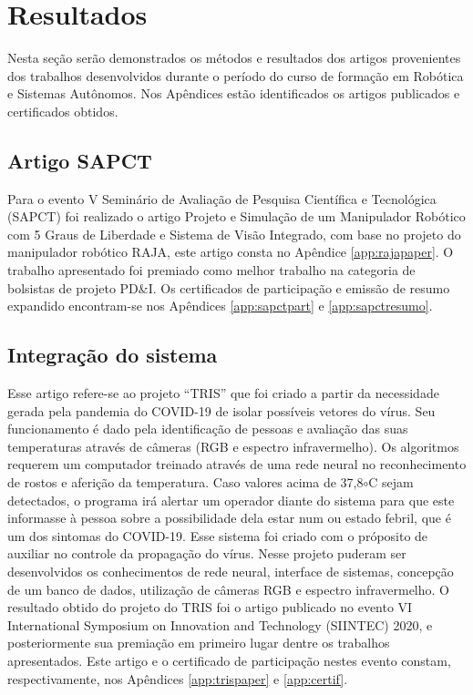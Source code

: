 \chapter{Resultados}
\label{chap:result}

Nesta seção serão demonstrados os métodos e resultados dos artigos provenientes dos
trabalhos desenvolvidos durante o período do curso de formação em Robótica e Sistemas Autônomos. Nos Apêndices estão identificados os artigos publicados e certificados obtidos.

\section{Artigo SAPCT}
\label{sec:artigoRAJA}

Para o evento V Seminário de Avaliação de Pesquisa Científica e Tecnológica (SAPCT)
foi realizado o artigo Projeto e Simulação de um Manipulador Robótico com 5 Graus de
Liberdade e Sistema de Visão Integrado, com base no projeto do manipulador robótico
RAJA, este artigo consta no Apêndice \ref{app:rajapaper}. O trabalho apresentado foi premiado como melhor trabalho na categoria de bolsistas de projeto PD\&I. Os certificados de participação e emissão de resumo expandido encontram-se nos Apêndices \ref{app:sapctpart} e \ref{app:sapctresumo}.


\section{Integração do sistema}
\label{sec:artigoTRIS}

Esse artigo refere-se ao projeto ``TRIS'' que foi criado a partir da necessidade gerada pela pandemia do COVID-19 de isolar possíveis vetores do vírus. Seu funcionamento é dado pela identificação de pessoas e avaliação das suas temperaturas através de câmeras (RGB e espectro infravermelho). Os algoritmos requerem um computador treinado através de uma rede neural no reconhecimento de rostos e aferição da temperatura. Caso valores acima de 37,8$\circ$C sejam detectados, o programa irá alertar um operador diante do sistema para que este informasse à pessoa sobre a possibilidade dela estar num ou estado febril, que é um dos sintomas do COVID-19. Esse sistema foi criado com o próposito de auxiliar no controle da propagação do vírus. Nesse projeto puderam ser desenvolvidos os conhecimentos de rede neural, interface de sistemas, concepção de um banco de dados, utilização de câmeras RGB e espectro infravermelho. O resultado obtido do projeto do TRIS foi o artigo publicado no evento VI International Symposium on Innovation and Technology (SIINTEC) 2020, e posteriormente sua premiação em primeiro lugar dentre os trabalhos apresentados. Este artigo e o certificado de participação nestes evento constam, respectivamente, nos Apêndices \ref{app:trispaper} e \ref{app:certif}.



